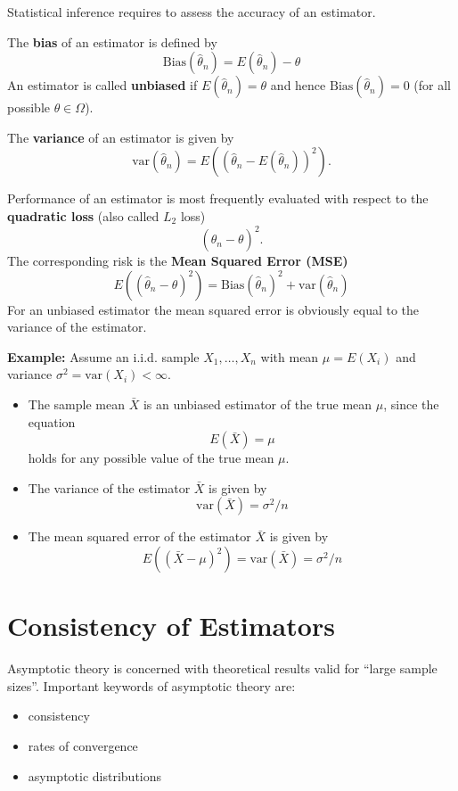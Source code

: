 \documentclass[]{book}
\providecommand{\tightlist}{%
  \setlength{\itemsep}{0pt}\setlength{\parskip}{0pt}}
\theoremstyle{definition}
\theoremstyle{definition}
\theoremstyle{definition}
\theoremstyle{remark}
\begin{document}
Statistical inference requires to assess the accuracy of an estimator.

The \textbf{bias} of an estimator is defined by
\[\textrm{Bias}(\widehat{\theta}_n)=E(\widehat{\theta}_n)-\theta\]
An estimator is called \textbf{unbiased} if \(E(\widehat{\theta}_n)=\theta\) and hence \(\textrm{Bias}(\widehat{\theta}_n)=0\) (for all possible \(\theta\in\Omega\)).

The \textbf{variance} of an estimator is given by
\[\textrm{var}(\widehat{\theta}_n)=E\left((\widehat{\theta}_n-E(\widehat{\theta}_n))^2\right).\]

Performance of an estimator is most frequently evaluated with respect to the \textbf{quadratic loss} (also
called \(L_2\) loss)
\[(\widehat{\theta}_n-\theta)^2.\]
The corresponding risk is the \textbf{Mean Squared Error (MSE)}
\[E\left((\widehat{\theta}_n-\theta)^2\right)=\textrm{Bias}(\widehat{\theta}_n)^2+\textrm{var}(\widehat{\theta}_n)\]
For an unbiased estimator the mean squared error is obviously equal to the variance of the estimator.

\textbf{Example:} Assume an i.i.d. sample \(X_1,\dots,X_n\) with mean \(\mu=E(X_i)\) and variance \(\sigma^2=\textrm{var}(X_i)<\infty\).

\begin{itemize}
\tightlist
\item
  The sample mean \(\bar X\) is an unbiased estimator of the true mean \(\mu\), since the equation
  \[E(\bar X)=\mu\]
  holds for any possible value of the true mean \(\mu\).
\item
  The variance of the estimator \(\bar X\) is given by
  \[\textrm{var}(\bar X)=\sigma^2/n\]
\item
  The mean squared error of the estimator \(\bar X\) is given by
  \[E\left((\bar X-\mu)^2\right)=\textrm{var}(\bar X)=\sigma^2/n\]
\end{itemize}

\hypertarget{consistency-of-estimators}{%
\section{Consistency of Estimators}\label{consistency-of-estimators}}

Asymptotic theory is concerned with theoretical results valid for ``large sample sizes''. Important keywords of asymptotic theory are:

\begin{itemize}
\tightlist
\item
  consistency
\item
  rates of convergence
\item
  asymptotic distributions
\end{itemize}
\end{document}
